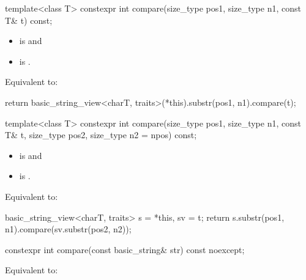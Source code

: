 %
\begin{itemdecl}
template<class T>
  constexpr int compare(size_type pos1, size_type n1, const T& t) const;
\end{itemdecl}

\begin{itemdescr}
\pnum
\constraints
\begin{itemize}
\item
{} is
 and
\item
{} is
.
\end{itemize}

\pnum
\effects
Equivalent to:
\begin{codeblock}
return basic_string_view<charT, traits>(*this).substr(pos1, n1).compare(t);
\end{codeblock}
\end{itemdescr}

%
\begin{itemdecl}
template<class T>
  constexpr int compare(size_type pos1, size_type n1, const T& t,
                        size_type pos2, size_type n2 = npos) const;
\end{itemdecl}

\begin{itemdescr}
\pnum
\constraints
\begin{itemize}
\item
{} is
 and
\item
{} is
.
\end{itemize}

\pnum
\effects
Equivalent to:
\begin{codeblock}
basic_string_view<charT, traits> s = *this, sv = t;
return s.substr(pos1, n1).compare(sv.substr(pos2, n2));
\end{codeblock}
\end{itemdescr}

%
\begin{itemdecl}
constexpr int compare(const basic_string& str) const noexcept;
\end{itemdecl}

\begin{itemdescr}
\pnum
\effects
Equivalent to:
\end{itemdescr}

